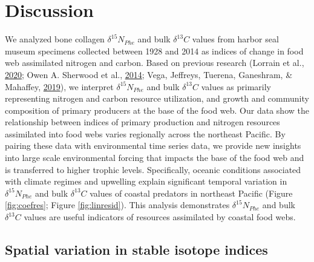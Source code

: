 \documentclass [11pt, proquest] {uwthesis}[2015/03/03]
\begin{document}
\section{Discussion}\label{discussion-1}

We analyzed bone collagen \(\delta^{15}N_{Phe}\) and bulk
\(\delta^{13}C\) values from harbor seal museum specimens collected
between 1928 and 2014 as indices of change in food web assimilated
nitrogen and carbon. Based on previous research (Lorrain et al.,
\protect\hyperlink{ref-Lorrain2020}{2020}; Owen A. Sherwood et al.,
\protect\hyperlink{ref-Sherwood2014}{2014}; Vega, Jeffreys, Tuerena,
Ganeshram, \& Mahaffey, \protect\hyperlink{ref-delaVega2019}{2019}), we
interpret \(\delta^{15}N_{Phe}\) and bulk \(\delta^{13}C\) values as
primarily representing nitrogen and carbon resource utilization, and
growth and community composition of primary producers at the base of the
food web. Our data show the relationship between indices of primary
production and nitrogen resources assimilated into food webs varies
regionally across the northeast Pacific. By pairing these data with
environmental time series data, we provide new insights into large scale
environmental forcing that impacts the base of the food web and is
transferred to higher trophic levels. Specifically, oceanic conditions
associated with climate regimes and upwelling explain significant
temporal variation in \(\delta^{15}N_{Phe}\) and bulk \(\delta^{13}C\)
values of coastal predators in northeast Pacific (Figure
\ref{fig:coefres}; Figure \ref{fig:linresid}). This analysis
demonstrates \(\delta^{15}N_{Phe}\) and bulk \(\delta^{13}C\) values are
useful indicators of resources assimilated by coastal food webs.

\subsection{Spatial variation in stable isotope
indices}\label{spatial-variation-in-stable-isotope-indices}
\end{document}
